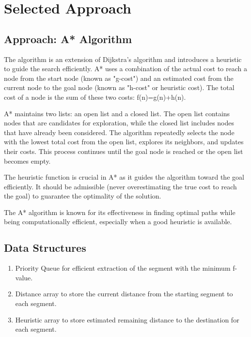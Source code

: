 \documentclass[a4paper, 12pt]{article}
\begin{document}
	
	
\newpage
	\section*{Selected Approach}
	\subsection*{Approach: A* Algorithm}
	The algorithm is an extension of Dijkstra's algorithm and introduces a heuristic to guide the search efficiently. A* uses a combination of the actual cost to reach a node from the start node (known as "g-cost") and an estimated cost from the current node to the goal node (known as "h-cost" or heuristic cost). The total cost of a node is the sum of these two costs: f(n)=g(n)+h(n).
	
	
	A* maintains two lists: an open list and a closed list. The open list contains nodes that are candidates for exploration, while the closed list includes nodes that have already been considered. The algorithm repeatedly selects the node with the lowest total cost from the open list, explores its neighbors, and updates their costs. This process continues until the goal node is reached or the open list becomes empty.
	
	The heuristic function is crucial in A* as it guides the algorithm toward the goal efficiently. It should be admissible (never overestimating the true cost to reach the goal) to guarantee the optimality of the solution.
	
	The A* algorithm is known for its effectiveness in finding optimal paths while being computationally efficient, especially when a good heuristic is available.
	
	\subsection*{Data Structures}
	\begin{enumerate}
		\item Priority Queue for efficient extraction of the segment with the minimum f-value.
		\item Distance array to store the current distance from the starting segment to each segment.
		\item Heuristic array to store estimated remaining distance to the destination for each segment.
	\end{enumerate}
	
\end{document}
